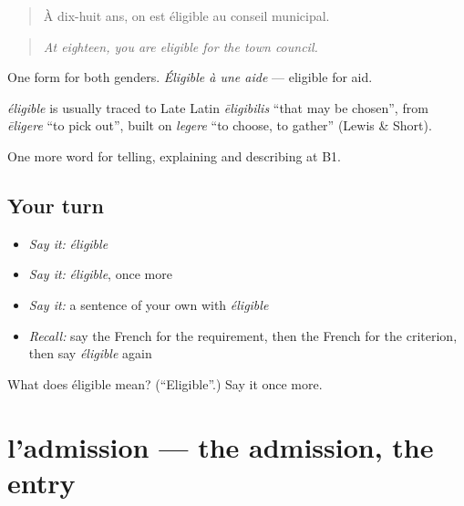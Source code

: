 \begin{quote}
À dix-huit ans, on est éligible au conseil municipal.
\end{quote}

\begin{quote}
\emph{At eighteen, you are eligible for the town council.}
\end{quote}

One form for both genders. \emph{Éligible à une aide} — eligible for aid.

\begin{cousinweb}
\emph{éligible} is usually traced to Late Latin \emph{ēligibilis} \textquotedblleft{}that may be chosen\textquotedblright{}, from \emph{ēligere} \textquotedblleft{}to pick out\textquotedblright{}, built on \emph{legere} \textquotedblleft{}to choose, to gather\textquotedblright{} (Lewis \& Short).
\end{cousinweb}

\begin{grammarlens}[title={What you've built}]
One more word for telling, explaining and describing at B1.
\end{grammarlens}

\subsection*{Your turn}
\begin{itemize}
\raggedright
  \item \emph{Say it:} \emph{éligible}
  \item \emph{Say it:} \emph{éligible}, once more
  \item \emph{Say it:} a sentence of your own with \emph{éligible}
  \item \emph{Recall:} say the French for the requirement, then the French for the criterion, then say \emph{éligible} again
\end{itemize}

\begin{tcolorbox}[breakable,colback=teal!4,colframe=teal!35!black,title={Before you move on}]
What does éligible mean? (\textquotedblleft{}Eligible\textquotedblright{}.) Say it once more.
\end{tcolorbox}
\section[l'admission]{l'admission — the admission, the entry}

\label{lesson:FR-C383-admission}



